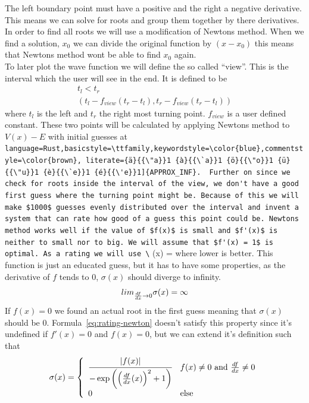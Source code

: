 \documentclass[11pt,DIV=10,final]{scrreprt} %
\providecommand{\rustinline}{\lstinline[language=Rust,basicstyle=\ttfamily,keywordstyle=\color{blue},commentstyle=\color{brown}, literate={ä}{{\"a}}1 {à}{{\`a}}1 {ö}{{\"o}}1 {ü}{{\"u}}1 {è}{{\`e}}1 {é}{{\'e}}1]} % für Inline-C++ Code
\newcommand{\deriv}[2]{%
  \frac{d#1}{d#2}
}
\begin{document}
{The left boundary point must have a positive and the right a negative derivative. This means we can solve for roots and group them together by there derivatives.
\\
In order to find all roots we will use a modification of Newtons method. When we find a solution, $x_{0}$ we can divide the original function by $(x - x_{0})$ this means that Newtons method wont be able to find $x_{0}$ again.
\\
\label{sec:view}
To later plot the wave function we will define the so called ``view''. This is the interval which the user will see in the end.
It is defined to be
\begin{align*}
  t_{l} < t_{r} \\
  \left(t_{l} - f_{view} (t_{r} - t_{l}), t_{r} - f_{view} (t_{r} - t_{l})\right)
\end{align*}
where $t_{l}$ is the left and $t_{r}$ the right most turning point. $f_{view}$ is a user defined constant.
These two points will be calculated by applying Newtons method to $V(x) - E$ with initial guesses at \rustinline{APPROX_INF}.

Further on since we check for roots inside the interval of the view, we don't
have a good first guess where the turning point might be. Because of this we will make $1000$
guesses evenly distributed over the interval and invent a system that can rate how good of a
guess this point could be.
Newtons method works well if the value of $f(x)$ is small and $f'(x)$ is neither to small nor to big. We will assume that $f'(x) = 1$ is optimal.
As a rating we will use
\[
  \label{eq:rating-newton}
  \sigma(x) = \cfrac{|f(x)| }{ -\exp\left({{\left(\deriv{f}{x}(x)\right)}^{2} + 1}\right)}
\]
where lower is better. This function is just an educated guess, but it has to have some properties, as the derivative of $f$ tends to 0, $\sigma(x)$ should diverge to infinity.
\[lim_{\deriv{f}{x} \to 0} \sigma(x) = \infty\]
If $f(x) = 0$ we found an actual root in the first guess meaning that $\sigma(x)$ should be 0.
Formula~\ref{eq:rating-newton} doesn't satisfy this property since it's undefined if $f'(x) = 0$ and $f(x) = 0$, but we can extend it's definition such that
\[
  \sigma(x) = \left\{
    \begin{array}{ll}
    \cfrac{|f(x)| }{ -\exp\left({{\left(\deriv{f}{x}(x)\right)}^{2} + 1}\right)} & f(x) \ne 0~\text{and}~\deriv{f}{x} \ne 0 \\
    0 & \text{else}
    \end{array}\right.
\]

}
\end{document}
